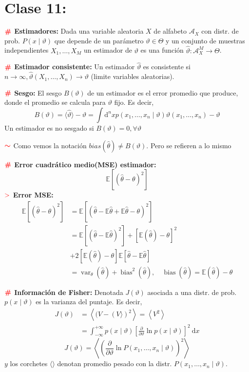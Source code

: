 \documentclass[%
 reprint,
 amsmath,amssymb,
 aps,
]{revtex4-1}
\begin{document}
\section{Clase 11:}

\textbf{$\color{red}{\textbf{\#}}$ Estimadores:} 
Dada una variable aleatoria $X$
de alfabeto $\mathcal{A}_{X}$
con distr. de prob.
$P(x \mid \vartheta)$ que depende de un parámetro $\vartheta \in \Theta$ y un conjunto de muestras independientes $X_{1}, \ldots, X_{M}$ un estimador de $\vartheta$ es una función $\hat{\vartheta}: \mathcal{A}_{X}^{M} \rightarrow \Theta$.

\textbf{$\color{red}{\textbf{\#}}$ Estimador consistente:} 
Un estimador $\hat{\vartheta}$ es consistente si $n \rightarrow \infty, \hat{\vartheta}\left(X_{1}, \ldots, X_{n}\right) \rightarrow \vartheta$ (limite variables aleatorias). 

\textbf{$\color{red}{\textbf{\#}}$ Sesgo:} 
El sesgo $B(\vartheta)$ de un estimador es el error promedio que produce, donde el promedio se calcula para $\vartheta$ fijo. Es decir,
$$
B(\vartheta)= \langle \hat{\vartheta} \rangle -\vartheta=\int \mathrm{d}^{n} x p\left(x_{1}, \ldots, x_{n} \mid \vartheta\right) \hat{\vartheta}\left(x_{1}, \ldots, x_{n}\right) - \vartheta
$$
Un estimador es no sesgado si $B(\vartheta)=0, \forall \vartheta$

\textbf{$\textcolor{red}{\color{red}{\boldsymbol{\sim}}}$} Como vemos la notación $bias(\hat{\theta}) \neq B(\vartheta)$. Pero se refieren a lo mismo

\textbf{$\color{red}{\textbf{\#}}$ Error cuadrático medio(MSE) estimador:} 
$$\mathbb{E} \left[(\hat{\theta}-\theta)^{2}\right]$$
\textbf{$\textcolor{red}{\mathbf{>}}$ Error MSE:} 
$$
\begin{aligned}
\mathbb{E} \left[(\hat{\theta}-\theta)^{2}\right] &=\mathbb{E} \left[\left(\hat{\theta}-\mathbb{E}  \hat{\theta}+\mathbb{E}  \hat{\theta}-\theta\right)^{2}\right] \\
&=\mathbb{E} \left[\left(\hat{\theta}-\mathbb{E}  \hat{\theta}\right)^{2}\right] 
+
\left[\mathbb{E} (\hat{\theta})-\theta\right]^{2} \\
&+ 2\left[\mathbb{E} (\hat{\theta})-\theta\right] \mathbb{E} \left[\hat{\theta}-\mathbb{E}  \hat{\theta}\right] \\
&=\operatorname{var}_{\theta}(\hat{\theta})+\operatorname{bias}^{2}(\hat{\theta}), \quad \operatorname{bias}(\hat{\theta})= \mathbb{E} (\hat{\theta})-\theta
\end{aligned}
$$

\textbf{$\color{red}{\textbf{\#}}$ Información de Fisher:} 
Denotada $J(\vartheta)$ asociada a una distr. de prob. $p(x \mid \vartheta)$ es la varianza
del puntaje. Es decir,
$$
\begin{aligned}
J(\vartheta) &=\left\langle(V-(V\rangle)^{2}\right\rangle =\left\langle V^{2}\right\rangle \\
&=\int_{-\infty}^{+\infty} p(x \mid \vartheta)\left[\frac{\partial}{\partial \vartheta} \ln p(x \mid \vartheta)\right]^{2} \mathrm{~d} x
\end{aligned}
$$
$$
J(\vartheta)=\left\langle\left(\frac{\partial}{\partial \vartheta} \ln P\left(x_{1}, \ldots, x_{n} \mid \vartheta\right)\right)^{2}\right\rangle
$$
$y$ los corchetes  $\langle \rangle$ denotan promedio pesado con la distr. $P\left(x_{1}, \ldots, x_{n} \mid \vartheta\right)$.
\end{document}
